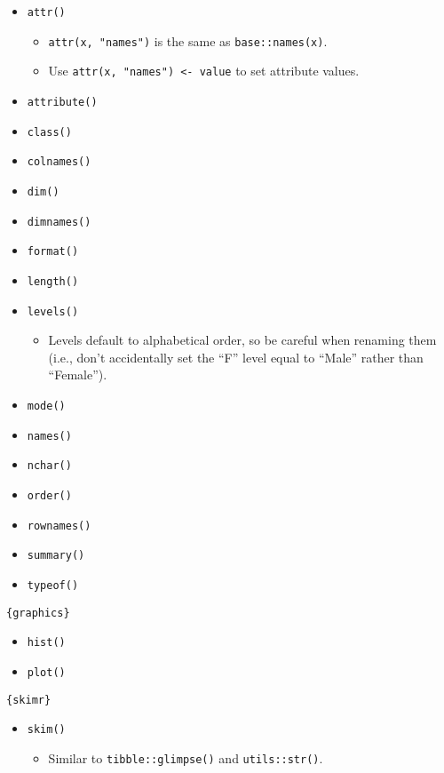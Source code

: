 \documentclass[
]{book}
\providecommand{\tightlist}{%
  \setlength{\itemsep}{0pt}\setlength{\parskip}{0pt}}
\begin{document}
\begin{itemize}
\tightlist
\item
  \texttt{attr()}

  \begin{itemize}
  \tightlist
  \item
    \texttt{attr(x,\ "names")} is the same as \texttt{base::names(x)}.
  \item
    Use \texttt{attr(x,\ "names")\ \textless{}-\ value} to set attribute values.
  \end{itemize}
\item
  \texttt{attribute()}
\item
  \texttt{class()}
\item
  \texttt{colnames()}
\item
  \texttt{dim()}
\item
  \texttt{dimnames()}
\item
  \texttt{format()}
\item
  \texttt{length()}
\item
  \texttt{levels()}

  \begin{itemize}
  \tightlist
  \item
    Levels default to alphabetical order, so be careful when renaming them (i.e., don't accidentally set the ``F'' level equal to ``Male'' rather than ``Female'').
  \end{itemize}
\item
  \texttt{mode()}
\item
  \texttt{names()}
\item
  \texttt{nchar()}
\item
  \texttt{order()}
\item
  \texttt{rownames()}
\item
  \texttt{summary()}
\item
  \texttt{typeof()}
\end{itemize}

\texttt{\{graphics\}}

\begin{itemize}
\tightlist
\item
  \texttt{hist()}
\item
  \texttt{plot()}
\end{itemize}

\texttt{\{skimr\}}

\begin{itemize}
\tightlist
\item
  \texttt{skim()}

  \begin{itemize}
  \tightlist
  \item
    Similar to \texttt{tibble::glimpse()} and \texttt{utils::str()}.
  \end{itemize}
\end{itemize}
\end{document}
